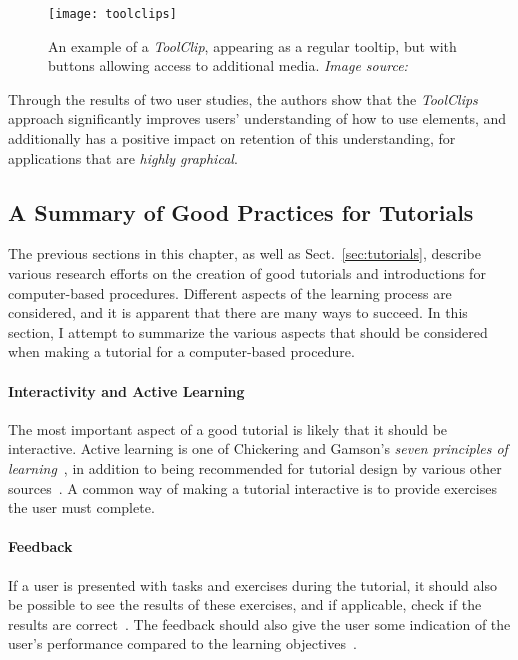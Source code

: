 \begin{figure}[htp]
	\centering
	\texttt{[image: toolclips]}
	\caption[\emph{ToolClips} example]{An example of a \emph{ToolClip}, appearing as a regular tooltip, but with buttons allowing access to additional media. \emph{Image source:~\cite{grossman:toolclips}}}
	\label{fig:toolclips}
\end{figure}

\noindent
Through the results of two user studies, the authors show that the \emph{ToolClips} approach significantly improves users' understanding of how to use elements, and additionally has a positive impact on retention of this understanding, for applications that are \emph{highly graphical}.

\subsection{A Summary of Good Practices for Tutorials}
\label{sec:good_practices_tutorials}
The previous sections in this chapter, as well as Sect.~\ref{sec:tutorials}, describe various research efforts on the creation of good tutorials and introductions for computer-based procedures. Different aspects of the learning process are considered, and it is apparent that there are many ways to succeed. In this section, I attempt to summarize the various aspects that should be considered when making a tutorial for a computer-based procedure.

\paragraph{Interactivity and Active Learning} The most important aspect of a good tutorial is likely that it should be interactive. Active learning is one of Chickering and Gamson's \emph{seven principles of learning}~\cite{chickering:seven_principles}, in addition to being recommended for tutorial design by various other sources~\cite{bowerman:tutorial_design, aberson:tutorial_evaluation}. A common way of making a tutorial interactive is to provide exercises the user must complete.

\paragraph{Feedback} If a user is presented with tasks and exercises during the tutorial, it should also be possible to see the results of these exercises, and if applicable, check if the results are correct~\cite{chickering:seven_principles}. The feedback should also give the user some indication of the user's performance compared to the learning objectives~\cite{bowerman:tutorial_design}.


